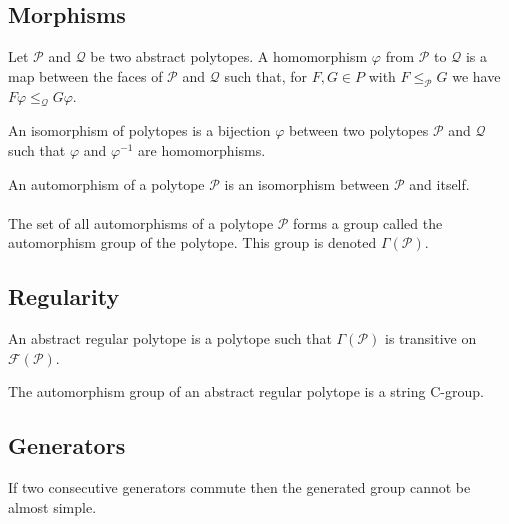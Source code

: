 \subsection{Morphisms}

\begin{definition}
  Let $\mathcal P$ and $\mathcal Q$ be two abstract polytopes. A homomorphism $\varphi$ from $\mathcal P$ to $\mathcal Q$ is a map between the faces of $\mathcal P$ and $\mathcal Q$ such that, for $F, G \in P$ with $F \le_{\mathcal P} G$ we have $F\varphi \le_{\mathcal Q} G\varphi$.
\end{definition}

\begin{definition}
  An isomorphism of polytopes is a bijection $\varphi$ between two polytopes $\mathcal P$ and $\mathcal Q$ such that $\varphi$ and $\varphi^{-1}$ are homomorphisms.
\end{definition}

\begin{definition}
  An automorphism of a polytope $\mathcal P$ is an isomorphism between $\mathcal P$ and itself.
\end{definition}

\paragraph{}
The set of all automorphisms of a polytope $\mathcal P$ forms a group called the automorphism group of the polytope. This group is denoted $\Gamma(\mathcal P)$.

\subsection{Regularity}

\begin{definition}
  An abstract regular polytope is a polytope such that $\Gamma(\mathcal P)$ is transitive on $\mathcal F(\mathcal P)$.
\end{definition}

\begin{theorem}
  The automorphism group of an abstract regular polytope is a string C-group.
\end{theorem}

\subsection{Generators}

\begin{proposition}
  \label{adjacent-must-not-commute}
  If two consecutive generators commute then the generated group cannot be almost simple.
\end{proposition}
